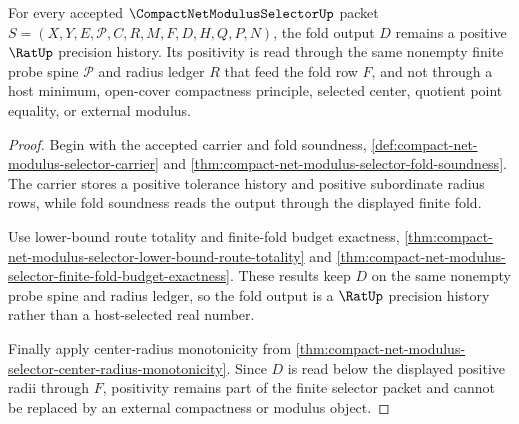 \begin{theorem}
\label{thm:compact-net-modulus-selector-fold-output-positive}
For every accepted $\CompactNetModulusSelectorUp$ packet $S=(X,Y,E,\mathcal{P},C,R,M,F,D,H,Q,P,N)$, the fold output $D$ remains a positive $\RatUp$ precision history. Its positivity is read through the same nonempty finite probe spine $\mathcal{P}$ and radius ledger $R$ that feed the fold row $F$, and not through a host minimum, open-cover compactness principle, selected center, quotient point equality, or external modulus.
\end{theorem}
\begin{proof}
Begin with the accepted carrier and fold soundness, \autoref{def:compact-net-modulus-selector-carrier} and \autoref{thm:compact-net-modulus-selector-fold-soundness}. The carrier stores a positive tolerance history and positive subordinate radius rows, while fold soundness reads the output through the displayed finite fold.

Use lower-bound route totality and finite-fold budget exactness, \autoref{thm:compact-net-modulus-selector-lower-bound-route-totality} and \autoref{thm:compact-net-modulus-selector-finite-fold-budget-exactness}. These results keep $D$ on the same nonempty probe spine and radius ledger, so the fold output is a $\RatUp$ precision history rather than a host-selected real number.

Finally apply center-radius monotonicity from \autoref{thm:compact-net-modulus-selector-center-radius-monotonicity}. Since $D$ is read below the displayed positive radii through $F$, positivity remains part of the finite selector packet and cannot be replaced by an external compactness or modulus object.
\end{proof}

